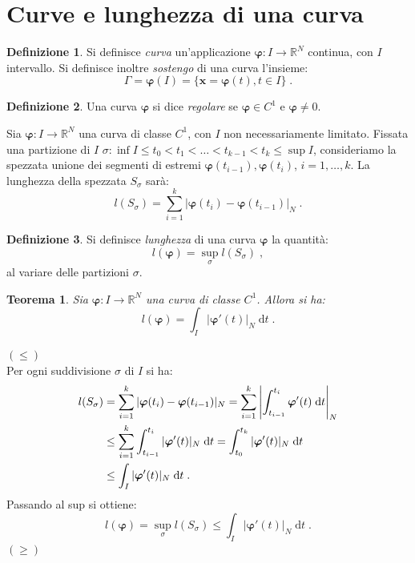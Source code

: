 \documentclass[a4paper,12pt]{report}
\theoremstyle{plain}
\newtheorem{thm}{Teorema}[section]
\theoremstyle{definition}
\newtheorem{defn}{Definizione}[section]
\theoremstyle{remark}
\newcommand{\diff}[1]{\mathrm{d}#1}
\numberwithin{equation}{section}
\begin{document}
\section{Curve e lunghezza di una curva}
\begin{defn} Si definisce \textit{curva} un'applicazione $\boldsymbol{\varphi}:I\to \mathbb{R}^N$ continua, con $I$ intervallo. Si definisce inoltre \textit{sostengo} di una curva l'insieme:
\begin{equation}
\Gamma=\boldsymbol{\varphi}(I)=\{\mathbf{x}=\boldsymbol{\varphi}(t),t\in I\}\;.
\end{equation}
\end{defn}
\begin{defn} Una curva $\boldsymbol{\varphi}$ si dice \textit{regolare} se $\boldsymbol{\varphi}\in C^1$ e $\boldsymbol{\varphi}\ne 0$.
\end{defn}
Sia $\boldsymbol{\varphi}:I\to\mathbb{R}^N$ una curva di classe $C^1$, con $I$ non necessariamente limitato. Fissata una partizione di $I$ $\sigma:\inf I\le t_0<t_1<\ldots<t_{k-1}<t_k\le\sup I$, consideriamo la spezzata unione dei segmenti di estremi $\boldsymbol{\varphi}
(t_{i-1}),\boldsymbol{\varphi}(t_i)$, $i=1,\ldots,k$. La lunghezza della spezzata $S_{\sigma}$ sarà:
\begin{equation}
l(S_{\sigma})=\sum_{i=1}^k |\boldsymbol{\varphi}(t_i)-\boldsymbol{\varphi}(t_{i-1})|_N\;.
\end{equation}
\begin{defn} Si definisce \textit{lunghezza} di una curva $\boldsymbol{\varphi}$ la quantità:
\begin{equation}
l(\boldsymbol{\varphi})=\sup_{\sigma} l(S_{\sigma})\;,
\end{equation}
al variare delle partizioni $\sigma$.
\end{defn}
\begin{thm} Sia $\boldsymbol{\varphi}:I\to\mathbb{R}^N$ una curva di classe $C^1$. Allora si ha:
\begin{equation}
l(\boldsymbol{\varphi})=\int_I |\boldsymbol{\varphi}'(t)|_N\;\diff{t}\;.
\end{equation}
\end{thm}
\proof $(\le)$ \\

Per ogni suddivisione $\sigma$ di $I$ si ha:
\begin{align}
l(S_{\sigma}) &= \sum_{i=1}^k|\boldsymbol{\varphi}(t_i)-\boldsymbol{\varphi}(t_{i-1})|_N=\sum_{i=1}^k\left|\int_{t_{i-1}}^{t_i}\boldsymbol{\varphi}'(t)\;\diff{t}\right|_N \notag \\
&\le \sum_{i=1}^k\int_{t_{i-1}}^{t_i}|\boldsymbol{\varphi}'(t)|_N\;\diff{t}=\int_{t_0}^{t_k}|\boldsymbol{\varphi}'(t)|_N\;\diff{t} \notag \\
&\le \int_I |\boldsymbol{\varphi}'(t)|_N\;\diff{t}\;.
\end{align}
Passando al sup si ottiene:
\begin{equation}
l(\boldsymbol{\varphi})=\sup_{\sigma}l(S_{\sigma})\le\int_I |\boldsymbol{\varphi}'(t)|_N\;\diff{t}\;.
\end{equation}
\endproof
\proof $(\ge)$ \\
\end{document}
